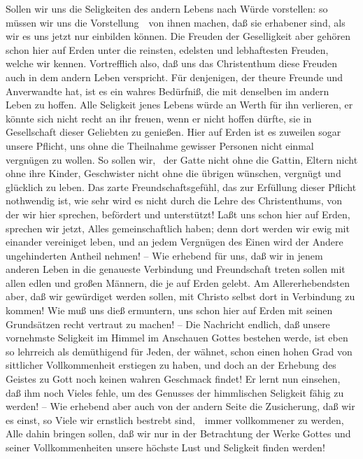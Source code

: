 \begin{aufza}
\item Sollen wir uns die Seligkeiten des andern Lebens nach Würde vorstellen: so müssen wir uns die Vorstellung~\ von ihnen machen, daß sie erhabener sind, als wir es uns jetzt nur einbilden können. Die Freuden der Geselligkeit aber gehören schon hier auf Erden unter die reinsten, edelsten und lebhaftesten Freuden, welche wir kennen. Vortrefflich also, daß uns das Christenthum diese Freuden auch in dem andern Leben verspricht. Für denjenigen, der theure Freunde und Anverwandte hat, ist es ein wahres Bedürfniß, die  mit denselben im andern Leben zu hoffen. Alle Seligkeit jenes Lebens würde an Werth für ihn verlieren, er könnte sich nicht recht an ihr freuen, wenn er nicht hoffen dürfte, sie in Gesellschaft dieser Geliebten zu genießen. Hier auf Erden ist es zuweilen sogar unsere Pflicht, uns ohne die Theilnahme gewisser Personen nicht einmal vergnügen zu wollen. So sollen wir, \zB\ der Gatte nicht ohne die Gattin, Eltern nicht ohne ihre Kinder, Geschwister nicht ohne die übrigen wünschen, vergnügt und glücklich zu leben. Das zarte Freundschaftsgefühl, das zur Erfüllung dieser Pflicht nothwendig ist, wie sehr wird es nicht durch die Lehre des Christenthums, von der wir hier sprechen, befördert und unterstützt! Laßt uns schon hier auf Erden, sprechen wir jetzt, Alles gemeinschaftlich haben; denn dort werden wir ewig mit einander vereiniget leben, und an jedem Vergnügen des Einen wird der Andere ungehinderten Antheil nehmen! -- Wie erhebend für uns, daß wir in jenem anderen Leben in die genaueste Verbindung und Freundschaft treten sollen mit allen edlen und großen Männern, die je auf Erden gelebt. Am Allererhebendsten aber, daß wir gewürdiget werden sollen, mit Christo selbst dort in Verbindung zu kommen! Wie muß uns dieß ermuntern, uns schon hier auf Erden mit seinen Grundsätzen recht vertraut zu machen! -- Die Nachricht endlich, daß unsere vornehmste Seligkeit im Himmel im Anschauen Gottes bestehen werde, ist eben so lehrreich als demüthigend für Jeden, der wähnet, schon einen hohen Grad von sittlicher Vollkommenheit erstiegen zu haben, und doch an der Erhebung des Geistes zu Gott noch keinen wahren Geschmack findet! Er lernt nun einsehen, daß ihm noch Vieles fehle, um des Genusses der himmlischen Seligkeit fähig zu werden! -- Wie erhebend aber auch von der andern Seite die Zusicherung, daß wir es einst, so Viele wir ernstlich bestrebt sind,~\ immer vollkommener zu werden, Alle dahin bringen sollen, daß wir nur in der Betrachtung der Werke Gottes und seiner Vollkommenheiten unsere höchste Lust und Seligkeit finden werden!

\end{aufza}
